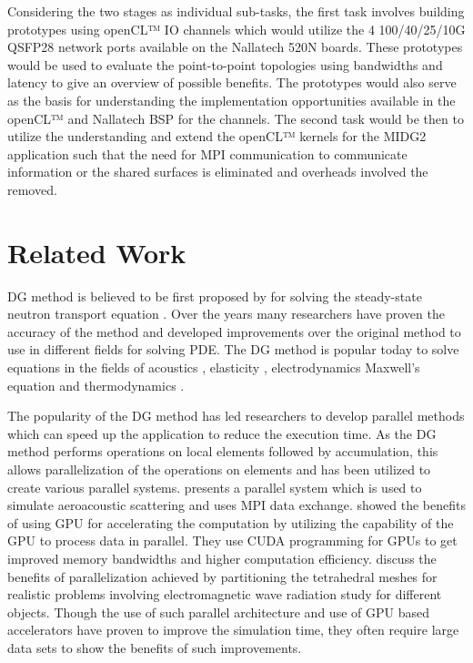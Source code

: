 Considering the two stages as individual sub-tasks, the first task involves building
prototypes using openCL™ IO channels which would utilize the 4 100/40/25/10G QSFP28
network ports available on the Nallatech 520N boards. These prototypes would be used
to evaluate the point-to-point topologies using bandwidths and latency to give an
overview of possible benefits. The prototypes would also serve as the basis for
understanding the implementation opportunities available in the openCL™ and 
Nallatech BSP for the channels. The second task would be then to utilize the
understanding and extend the openCL™ kernels for the MIDG2 application
such that the need for MPI communication to communicate information or the shared
surfaces is eliminated and overheads involved the removed.


\section{Related Work}

\ac{DG} method is believed to be first proposed by \textcite{reed_triangular_1973} for
solving the steady-state neutron transport equation \cite{hesthaven_nodal_2008}. Over the
years many researchers have proven the accuracy of the method and developed improvements
over the original method to use in different fields for solving \ac{PDE}. The \ac{DG} method
is popular today to solve equations in the fields of acoustics \cite{wilcox_high-order_2010,
atkins_quadrature-free_1998, toulopoulos_high-order_2006}, elasticity \cite{dumbser_arbitrary_2006,
kaser_arbitrary_2006, kaser_arbitrary_2007}, electrodynamics Maxwell’s equation \cite{busch_discontinuous_2011,
cohen_discontinuous_2006, busch_discontinuous_2011, cohen_spatial_2006, cockburn_locally_2004,
konig_discontinuous_2010} and thermodynamics \cite{collis_discontinuous_2002}.

The popularity of the \ac{DG} method has led researchers to develop parallel methods
which can speed up the application to reduce the execution time. As the DG method
performs operations on local elements followed by accumulation, this allows parallelization
of the operations on elements and has been utilized to create various parallel systems.
\textcite{baggag_parallel_1999} presents a parallel system which is used to simulate aeroacoustic
scattering and uses MPI data exchange. \textcite{klockner_nodal_2009} showed the benefits
of using GPU for accelerating the computation by utilizing the capability of the GPU to
process data in parallel. They use CUDA programming for GPUs to get improved memory bandwidths
and higher computation efficiency. \textcite{bernacki_parallel_2006} discuss the benefits
of parallelization achieved by partitioning the tetrahedral meshes for realistic problems
involving electromagnetic wave radiation study for different objects. Though the use of such
parallel architecture and use of GPU based accelerators have proven
to improve the simulation time, they often require large data sets to show the benefits of
such improvements.

